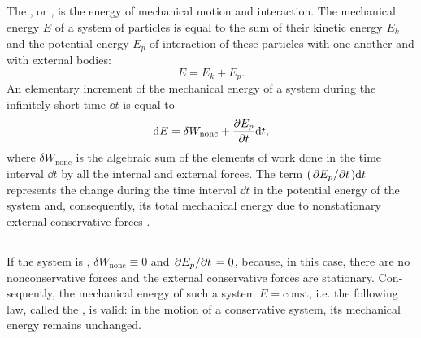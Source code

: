 \subsection{}\label{3.4.1} The , or , is the energy of mechanical motion and interaction. The mechanical energy $E$ of a system of particles is equal to the sum of their kinetic energy $E_{k}$ and the potential energy $E_{p}$ of interaction of these particles with one another and with external bodies:
\begin{equation*}%
E = E_{k} + E_{p}.
\end{equation*}
An elementary increment of the mechanical energy of a system during the infinitely short time $\dd t$ is equal to
\begin{equation*}%
\dd E = \delta W_{\textrm{nonc}} + \pdv{E_{p}}{t} \dd t,
\end{equation*}
where $\delta W_{\textrm{nonc}}$ is the algebraic sum of the elements of work done in the time interval $\dd t$ by all the internal and external  forces. The term $( \pdv*{E_{p}}{t}) \dd t$ represents the change during the time interval $\dd t$ in the potential energy of the system and, consequently, its total mechanical energy due to nonstationary external conservative forces . 

\subsection{}\label{3.4.2} If the system is  , $\delta W_{\textrm{nonc}} \equiv 0$ and $\pdv*{E_{p}}{t} = 0$, because, in this case, there are no nonconservative forces and the external conservative forces are stationary. Con­sequently, the mechanical energy of such a system $E = \textrm{const}$, i.e. the following law, called the , is valid: in the motion of a conservative system, its mechanical energy remains unchanged.

